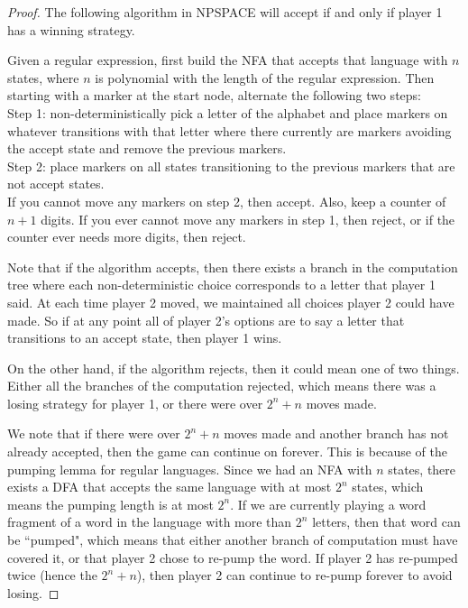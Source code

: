 \documentclass[runningheads,a4paper]{llncs}
\begin{document}
\begin{proof}
The following algorithm in NPSPACE will accept if and only if player 1 has a winning strategy.

Given a regular expression, first build the NFA that accepts that language with $n$ states, where $n$ is polynomial with the length of the regular expression. Then starting with a marker at the start node, alternate the following two steps:\\
Step 1: non-deterministically pick a letter of the alphabet and place markers on whatever transitions with that letter where there currently are markers avoiding the accept state and remove the previous markers. \\
Step 2: place markers on all states transitioning to the previous markers that are not accept states. \\
If you cannot move any markers on step 2, then accept. Also, keep a counter of $n+1$ digits. If you ever cannot move any markers in step 1, then reject, or if the counter ever needs more digits, then reject.

Note that if the algorithm accepts, then there exists a branch in the computation tree where each non-deterministic choice corresponds to a letter that player 1 said. At each time player 2 moved, we maintained all choices player 2 could have made. So if at any point all of player 2's options are to say a letter that transitions to an accept state, then player 1 wins. 

On the other hand, if the algorithm rejects, then it could mean one of two things. Either all the branches of the computation rejected, which means there was a losing strategy for player 1, or there were over $2^n+n$ moves made. 

We note that if there were over $2^n+n$ moves made and another branch has not already accepted, then the game can continue on forever. This is because of the pumping lemma for regular languages. Since we had an NFA with $n$ states, there exists a DFA that accepts the same language with at most $2^n$ states, which means the pumping length is at most $2^n$. If we are currently playing a word fragment of a word in the language with more than $2^n$ letters, then that word can be ``pumped", which means that either another branch of computation must have covered it, or that player 2 chose to re-pump the word. If player 2 has re-pumped twice (hence the $2^n + n$), then player 2 can continue to re-pump forever to avoid losing. 
\end{proof}
\end{document}
